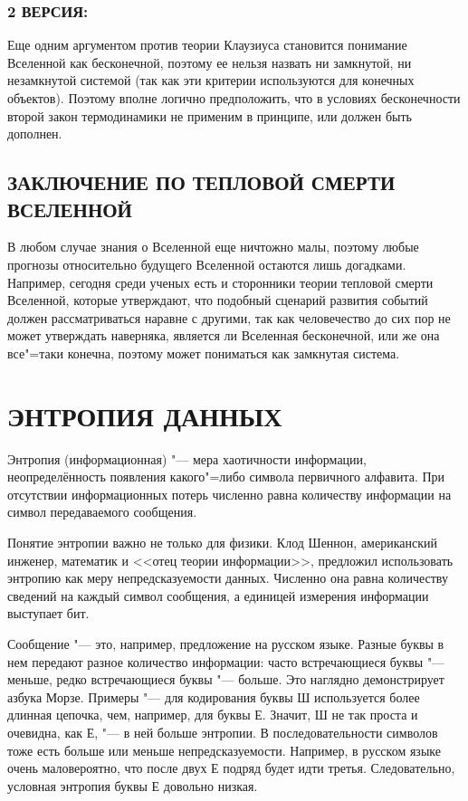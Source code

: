 \documentclass[referat, times]{SCWorks}
\begin{document}
\subsubsection{2 ВЕРСИЯ:}
Еще одним аргументом против теории Клаузиуса становится понимание Вселенной как бесконечной, поэтому ее нельзя назвать ни замкнутой, ни незамкнутой системой (так как эти критерии используются для конечных объектов). Поэтому вполне логично предположить, что в условиях бесконечности второй закон термодинамики не применим в принципе, или должен быть дополнен.
\subsection{ЗАКЛЮЧЕНИЕ ПО ТЕПЛОВОЙ СМЕРТИ ВСЕЛЕННОЙ}
В любом случае знания о Вселенной еще ничтожно малы, поэтому любые прогнозы относительно будущего Вселенной остаются лишь догадками. Например, сегодня среди ученых есть и сторонники теории тепловой смерти Вселенной, которые утверждают, что подобный сценарий развития событий должен рассматриваться наравне с другими, так как человечество до сих пор не может утверждать наверняка, является ли Вселенная бесконечной, или же она все"=таки конечна, поэтому может пониматься как замкнутая система\cite{smert}.

\section{ЭНТРОПИЯ ДАННЫХ}
Энтропия (информационная) "--- мера хаотичности информации, неопределённость появления какого"=либо символа первичного алфавита. При отсутствии информационных потерь численно равна количеству информации на символ передаваемого сообщения\cite{entr}.

Понятие энтропии важно не только для физики. Клод Шеннон, американский инженер, математик и <<отец теории информации>>, предложил использовать энтропию как меру непредсказуемости данных. Численно она равна количеству сведений на каждый символ сообщения, а единицей измерения информации выступает бит. 

Сообщение "--- это, например, предложение на русском языке. Разные буквы в нем передают разное количество информации: часто встречающиеся буквы "--- меньше, редко встречающиеся буквы "--- больше. Это наглядно демонстрирует азбука Морзе. Примеры "--- для кодирования буквы Ш используется более длинная цепочка, чем, например, для буквы Е.  Значит, Ш не так проста и очевидна, как Е, "--- в ней больше энтропии. В последовательности символов тоже есть больше или меньше непредсказуемости. Например, в русском языке очень маловероятно, что после двух Е подряд будет идти третья. Следовательно, условная энтропия буквы Е довольно низкая. 
\end{document}
